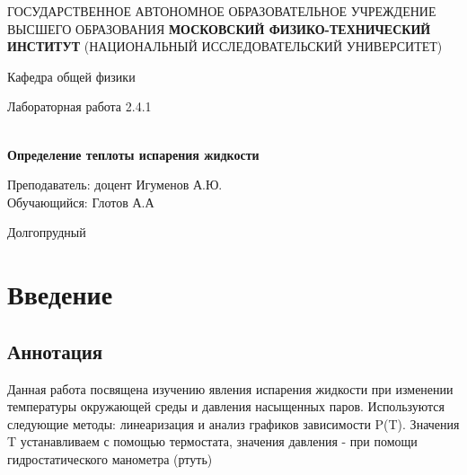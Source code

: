 \documentclass[12pt,a4paper]{article}
\author{Глотов Алексей}
\begin{document}
\newpage
\begin{center}
\footnotesize{{ГОСУДАРСТВЕННОЕ АВТОНОМНОЕ ОБРАЗОВАТЕЛЬНОЕ УЧРЕЖДЕНИЕ}\break
{ВЫСШЕГО ОБРАЗОВАНИЯ}
\break
{\bf {МОСКОВСКИЙ ФИЗИКО-ТЕХНИЧЕСКИЙ ИНСТИТУТ}}
\break
\small{(НАЦИОНАЛЬНЫЙ ИССЛЕДОВАТЕЛЬСКИЙ УНИВЕРСИТЕТ)}}
\break
\hfill \break
\hfill \break
\begin{center}
\normalsize{Кафедра общей физики}
\end{center}
\hfill \break
\hfill \break
\hfill \break
\hfill \break

\begin{center}
\normalsize {Лабораторная работа 2.4.1}
\end{center}
\hfill \break\\
\large{\textbf{Определение теплоты испарения жидкости}}
\end{center}
\begin{flushleft}
\hfill \break
\hfill \break
\hfill \break
\hfill \break
\hfill \break
\hfill \break
\hfill \break
\hfill \break
\hfill \break
\hfill \break
\hangindent=9cm
\normalsize{Преподаватель:}\hfill
\normalsize{доцент Игуменов А.Ю.}\\
\hfill \break
\normalsize{Обучающийся:}\hfill
\normalsize{Глотов А.А} \\
\hfill \break
\end{flushleft}
\hfill \break
\hfill \break
\hfill \break
\hfill \break
\hfill \break
\hfill \break
\hfill \break
\hfill \break
\hfill \break
\hfill \break
\hfill \break

\begin{center}
Долгопрудный 
\end{center}

\thispagestyle{empty}


\newpage
\section{Введение}

\subsection{Аннотация}

Данная работа посвящена изучению явления испарения жидкости при изменении температуры окружающей среды и давления насыщенных паров. Используются следующие методы: линеаризация и анализ графиков зависимости P(T). Значения T устанавливаем с помощью термостата, значения давления - при помощи гидростатического манометра (ртуть)
\end{document}
